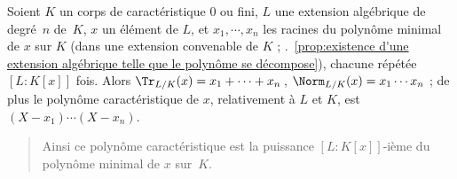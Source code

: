 \documentclass[11pt, useosf,
  title in boldface,
  theorem in new line,
  theorem numbering = section,
  number theorems separately,
]{simplivre}
\begin{document}
    \begin{proposition}\label{prop:trace;norme;polynôme caractéristique;extension}
        Soient \( K \) un corps de caractéristique \( 0 \) ou fini, \( L \) une extension algébrique de degré~\( n \) de~\( K \), \( x \) un élément de \( L \), et \( x_1, \cdots, x_n \) les racines du polynôme minimal de \( x \) sur \( K \) (dans une extension convenable de \( K \) ; \cf.~\cref{prop:existence d'une extension algébrique telle que le polynôme se décompose}), chacune répétée \( [L:K[x]] \) fois. Alors \( \Tr_{L/K}(x) = x_1 + \cdots + x_n \)\,, \( \Norm_{L/K}(x) = x_1 \cdots x_n \) ; de plus le polynôme caractéristique de \( x \), relativement à \( L \) et \( K \), est \( (X-x_1) \cdots (X-x_n) \).
    \end{proposition}
    \begin{quote}
        Ainsi ce polynôme caractéristique est la puissance \( [L:K[x]] \)‑ième du polynôme minimal de \( x \) sur~\( K \).
    \end{quote}
\end{document}
